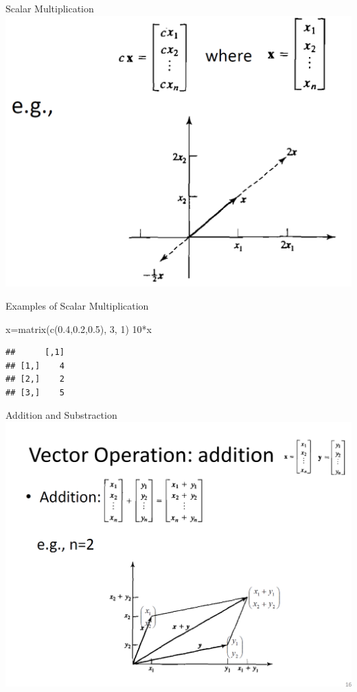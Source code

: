 \documentclass[
  ignorenonframetext,
]{beamer}
\newenvironment{Shaded}{\begin{snugshade}}{\end{snugshade}}
\newcommand{\DecValTok}[1]{\textcolor[rgb]{0.00,0.00,0.81}{#1}}
\newcommand{\FloatTok}[1]{\textcolor[rgb]{0.00,0.00,0.81}{#1}}
\newcommand{\FunctionTok}[1]{\textcolor[rgb]{0.00,0.00,0.00}{#1}}
\newcommand{\NormalTok}[1]{#1}
\newcommand{\OtherTok}[1]{\textcolor[rgb]{0.56,0.35,0.01}{#1}}
\newcommand{\SpecialCharTok}[1]{\textcolor[rgb]{0.00,0.00,0.00}{#1}}
\begin{document}
\begin{frame}{Scalar Multiplication}
\protect\hypertarget{scalar-multiplication}{}
\includegraphics[width=0.6\linewidth]{img/VecScalarMultiplication}
\end{frame}

\begin{frame}[fragile]{Examples of Scalar Multiplication}
\protect\hypertarget{examples-of-scalar-multiplication}{}
\begin{Shaded}
\begin{Highlighting}[]
\NormalTok{x}\OtherTok{=}\FunctionTok{matrix}\NormalTok{(}\FunctionTok{c}\NormalTok{(}\FloatTok{0.4}\NormalTok{,}\FloatTok{0.2}\NormalTok{,}\FloatTok{0.5}\NormalTok{), }\DecValTok{3}\NormalTok{, }\DecValTok{1}\NormalTok{)}
\DecValTok{10}\SpecialCharTok{*}\NormalTok{x}
\end{Highlighting}
\end{Shaded}

\begin{verbatim}
##      [,1]
## [1,]    4
## [2,]    2
## [3,]    5
\end{verbatim}
\end{frame}

\begin{frame}{Addition and Substraction}
\protect\hypertarget{addition-and-substraction}{}
\includegraphics[width=0.7\linewidth]{img/VecAddition}
\end{frame}
\end{document}
